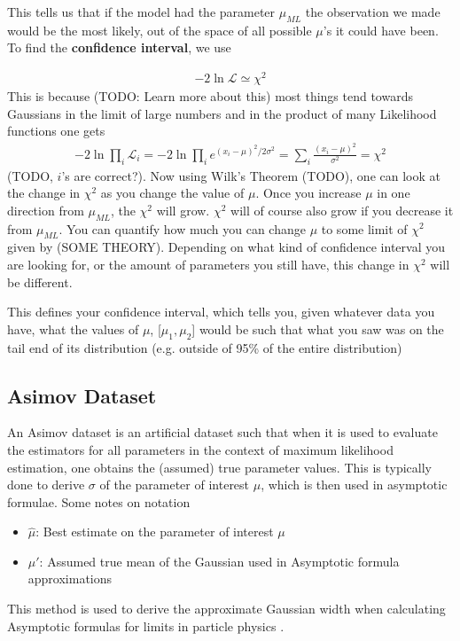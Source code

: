 
This tells us that if the model had the parameter $\mu_{ML}$ the observation we made would be the most likely, out of the space of all possible $\mu$'s it could have been. To find the \textbf{confidence interval}, we use

\begin{align}
-2\ln\mathcal{L} \simeq \chi^2
\end{align}
This is because (TODO: Learn more about this) most things tend towards Gaussians in the limit of large numbers and in the product of many Likelihood functions one gets
\begin{align}
	-2\ln\prod_i\mathcal{L}_i = -2\ln\prod_i e^{(x_i-\mu)^2/2\sigma^2} = \sum_i\frac{(x_i-\mu)^2}{\sigma^2} = \chi^2
\end{align}
(TODO, $i$'s are correct?). Now using Wilk's Theorem (TODO), one can look at the change in $\chi^2$ as you change the value of $\mu$. Once you increase $\mu$ in one direction from $\mu_{ML}$, the $\chi^2$ will grow. $\chi^2$ will of course also grow if you decrease it from $\mu_{ML}$. You can quantify how much you can change $\mu$ to some limit of $\chi^2$ given by (SOME THEORY). Depending on what kind of confidence interval you are looking for, or the amount of parameters you still have, this change in $\chi^2$ will be different. 

This defines your confidence interval, which tells you, given whatever data you have, what the values of $\mu$,  [$\mu_1, \mu_2$] would be such that what you saw was on the tail end of its distribution (e.g. outside of 95\% of the entire distribution)

\subsection{Asimov Dataset}
An Asimov dataset is an artificial dataset such that when it is used to evaluate the estimators for all parameters in the context of maximum likelihood estimation, one obtains the (assumed) true parameter values. This is typically done to derive $\sigma$ of the parameter of interest $\mu$, which is then used in asymptotic formulae. Some notes on notation
\begin{itemize}
	\item $\hat{\mu}$: Best estimate on the parameter of interest $\mu$
	\item $\mu'$: Assumed true mean of the Gaussian used in Asymptotic formula approximations
\end{itemize}
This method is used to derive the approximate Gaussian width when calculating Asymptotic formulas for limits in particle physics \cite{cowan}.


